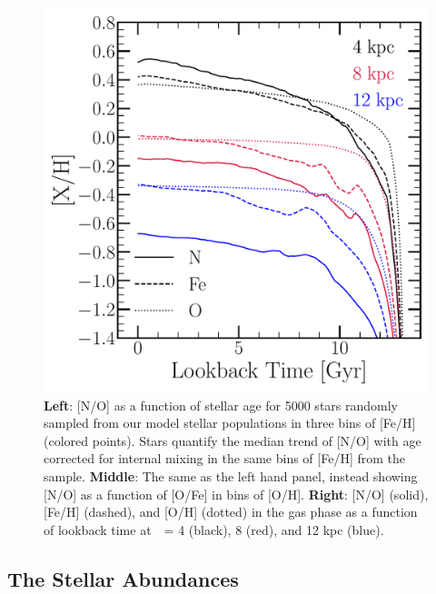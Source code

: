 \documentclass[ms.tex]{subfiles}
\begin{document}
\begin{figure}
\includegraphics[scale = 0.3]{nh_feh_vs_lookback.pdf} 
\caption{
\textbf{Left}: [N/O] as a function of stellar age for 5000 stars randomly 
sampled from our model stellar populations in three bins of [Fe/H] (colored 
points). 
Stars quantify the median trend of [N/O] with age corrected for internal mixing 
in the same bins of [Fe/H] from the~\citet{Vincenzo2021} sample. 
\textbf{Middle}: The same as the left hand panel, instead showing [N/O] as a 
function of [O/Fe] in bins of [O/H]. 
\textbf{Right}: [N/O] (solid), [Fe/H] (dashed), and [O/H] (dotted) in the gas 
phase as a function of lookback time at~\rgal~= 4 (black), 8 (red), and 12 kpc 
(blue). 
} 
\label{fig:vincenzo_comp} 
\end{figure} 

\subsection{The Stellar Abundances}  
\label{sec:results:vincenzo_comp} 
\end{document}
